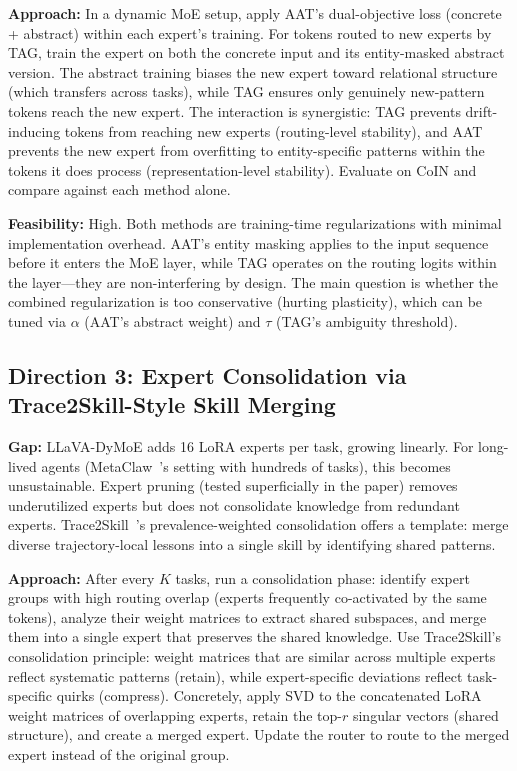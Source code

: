 \documentclass[11pt]{article}
\begin{document}
\textbf{Approach:} In a dynamic MoE setup, apply AAT's dual-objective loss (concrete + abstract) within each expert's training. For tokens routed to new experts by TAG, train the expert on both the concrete input and its entity-masked abstract version. The abstract training biases the new expert toward relational structure (which transfers across tasks), while TAG ensures only genuinely new-pattern tokens reach the new expert. The interaction is synergistic: TAG prevents drift-inducing tokens from reaching new experts (routing-level stability), and AAT prevents the new expert from overfitting to entity-specific patterns within the tokens it does process (representation-level stability). Evaluate on CoIN and compare against each method alone.

\textbf{Feasibility:} High. Both methods are training-time regularizations with minimal implementation overhead. AAT's entity masking applies to the input sequence before it enters the MoE layer, while TAG operates on the routing logits within the layer---they are non-interfering by design. The main question is whether the combined regularization is too conservative (hurting plasticity), which can be tuned via $\alpha$ (AAT's abstract weight) and $\tau$ (TAG's ambiguity threshold).

\subsection{Direction 3: Expert Consolidation via Trace2Skill-Style Skill Merging}

\textbf{Gap:} LLaVA-DyMoE adds 16 LoRA experts per task, growing linearly. For long-lived agents (MetaClaw~\cite{metaclaw}'s setting with hundreds of tasks), this becomes unsustainable. Expert pruning (tested superficially in the paper) removes underutilized experts but does not consolidate knowledge from redundant experts. Trace2Skill~\cite{trace2skill}'s prevalence-weighted consolidation offers a template: merge diverse trajectory-local lessons into a single skill by identifying shared patterns.

\textbf{Approach:} After every $K$ tasks, run a consolidation phase: identify expert groups with high routing overlap (experts frequently co-activated by the same tokens), analyze their weight matrices to extract shared subspaces, and merge them into a single expert that preserves the shared knowledge. Use Trace2Skill's consolidation principle: weight matrices that are similar across multiple experts reflect systematic patterns (retain), while expert-specific deviations reflect task-specific quirks (compress). Concretely, apply SVD to the concatenated LoRA weight matrices of overlapping experts, retain the top-$r$ singular vectors (shared structure), and create a merged expert. Update the router to route to the merged expert instead of the original group.
\end{document}
